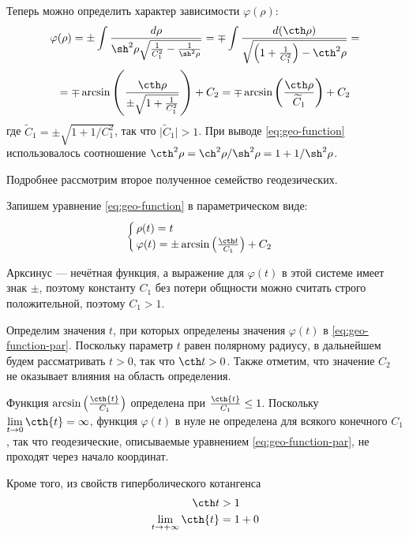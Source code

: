 \documentclass{article}
\numberwithin{equation}{section}
\renewcommand{\phi}{\varphi}
\begin{document}
\begin{rlist}
  Теперь можно определить характер зависимости $\phi(\rho)$:
  \begin{multline}\label{eq:geo-function}
    \phi(\rho) = \pm \int \frac{d\rho}{\sh^2\rho
      \sqrt{\frac{1}{C_1^2}-\frac{1}{\sh^2\rho}}} =
    \mp \int\frac{d(\cth\rho)}{\sqrt{\left(1 + \frac{1}{C_1^2} \right)-\cth^2 \rho}} = \\
    = \mp \arcsin\left(\frac{\cth\rho}{\pm\sqrt{1 + \frac{1}{C_1^2}}}\right) + C_2 =
    \mp \arcsin\left(\frac{\cth\rho}{\widetilde{C}_1}\right) + C_2
  \end{multline}
  где $\widetilde{C}_1 = \pm\sqrt{1+1/C_1^2}$, так что
  $\lvert\widetilde{C}_1\rvert>1$. При выводе \eqref{eq:geo-function}
  использовалось соотношение $\cth^2\rho = {\ch^2\rho}/{\sh^2\rho} =
  1+{1}/{\sh^2\rho}$.

\end{rlist}

Подробнее рассмотрим второе полученное семейство геодезических.

Запишем уравнение \eqref{eq:geo-function} в параметрическом виде:
\begin{equation}\label{eq:geo-function-par}
  \begin{cases}
    \rho(t) = t \\
    \phi(t) = \pm \arcsin\left(\frac{\cth t}{C_1}\right) + C_2
  \end{cases}
\end{equation}

Арксинус — нечётная функция, а выражение для $\phi(t)$ в этой системе
имеет знак $\pm$, поэтому константу $C_1$ без потери общности можно
считать строго положительной, поэтому $C_1 > 1$.

Определим значения $t$, при которых определены значения $\phi(t)$ в
\eqref{eq:geo-function-par}. Поскольку параметр $t$ равен полярному
радиусу, в дальнейшем будем рассматривать $t>0$, так что $\cth t > 0$.
Также отметим, что значение $C_2$ не оказывает влияния на область
определения.

Функция $\arcsin{\left(\frac{\cth{t}}{C_1}\right)}$ определена при
$\frac{\cth{t}}{C_1} \leq 1$. Поскольку \mbox{$\lim
  \limits_{t\to 0}{\cth{t}} = \infty$}, функция $\phi(t)$ в нуле не
определена для всякого конечного $C_1$, так что геодезические,
описываемые уравнением \eqref{eq:geo-function-par}, не проходят через
начало координат.

Кроме того, из свойств гиперболического котангенса
\begin{align*}
  \cth t &> 1 \\
  \lim_{t \to +\infty}{\cth{t}} &= 1 + 0
\end{align*}
\end{document}

